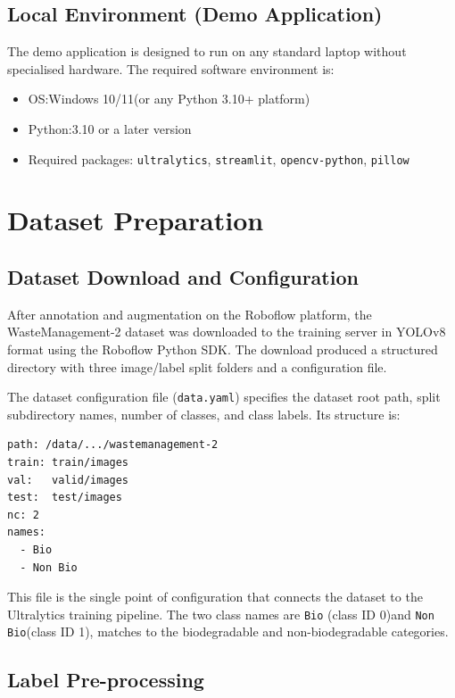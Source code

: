 \subsection{Local Environment (Demo Application)}

The demo application is designed to run on any standard laptop without specialised hardware. The required software environment is:

\begin{itemize}
    \item OS:Windows 10/11(or any Python 3.10+ platform)
    \item Python:3.10 or a later version
    \item Required packages: \texttt{ultralytics}, \texttt{streamlit}, \texttt{opencv-python}, \texttt{pillow}
\end{itemize}

\section{Dataset Preparation}

\subsection{Dataset Download and Configuration}

After annotation and augmentation on the Roboflow platform, the WasteManagement-2 dataset was downloaded to the training server in YOLOv8 format using the Roboflow Python SDK. The download produced a structured directory with three image/label split folders and a configuration file.

The dataset configuration file (\texttt{data.yaml}) specifies the dataset root path, split subdirectory names, number of classes, and class labels. Its structure is:

\begin{lstlisting}[caption=data.yaml — Dataset Configuration File]
path: /data/.../wastemanagement-2
train: train/images
val:   valid/images
test:  test/images
nc: 2
names:
  - Bio
  - Non Bio
\end{lstlisting}

This file is the single point of configuration that connects the dataset to the Ultralytics training pipeline. The two class names are \texttt{Bio} (class ID 0)and \texttt{Non Bio}(class ID 1), matches to the biodegradable and non-biodegradable categories.

\subsection{Label Pre-processing}

